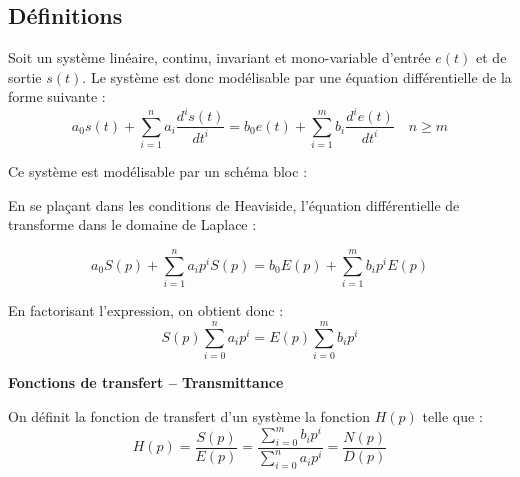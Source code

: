 \documentclass[11pt,oneside]{article}
\begin{document}
\subsection{Définitions}
Soit un système linéaire, continu, invariant et mono-variable d'entrée $e(t)$
et de sortie $s(t)$. Le système est donc modélisable par une équation
différentielle de la forme suivante :
$$
a_0 s(t) + \sum\limits_{i=1}^{n} a_i\dfrac{d^is(t)}{dt^i} = 
b_0 e(t) + \sum\limits_{i=1}^{m} b_i\dfrac{d^ie(t)}{dt^i}
\quad n\geq m
$$

\begin{minipage}[c]{.6\linewidth}
Ce système est modélisable par un schéma bloc : 
\end{minipage}\hfill
\begin{minipage}[c]{.35\linewidth}
\end{minipage}


En se plaçant dans les conditions de Heaviside, l'équation différentielle de
transforme dans le domaine de Laplace :

$$
a_0 S(p) + \sum\limits_{i=1}^{n} a_i p^i S(p) = 
b_0 E(p) + \sum\limits_{i=1}^{m} b_i p^i E(p) 
$$

En factorisant l'expression, on obtient donc : 
$$
S(p) \sum\limits_{i=0}^{n} a_i p^i  = 
E(p) \sum\limits_{i=0}^{m} b_i p^i 
$$


\begin{defi}
 \textbf{Fonctions de transfert -- Transmittance}

On définit la fonction de transfert d'un système la fonction $H(p)$ telle que :
$$
H(p)
=\dfrac{S(p)}{E(p)} 
= \dfrac{\sum\limits_{i=0}^{m} b_i p^i}{\sum\limits_{i=0}^{n} a_i p^i}
=\dfrac{N(p)}{D(p)} 
$$
\end{defi}
\end{document}
